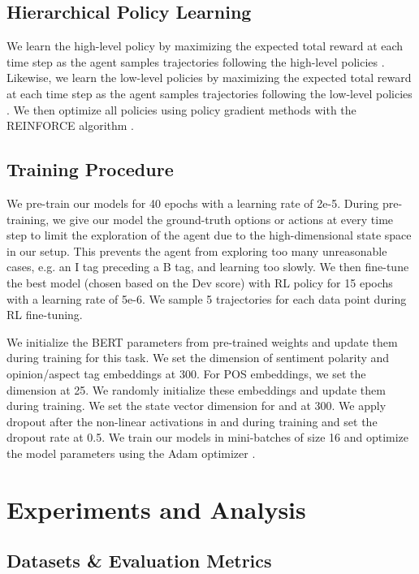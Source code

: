 \documentclass[sigconf]{acmart}
\begin{document}
\begin{table}[ht!]
\subsection{Hierarchical Policy Learning}
We learn the high-level policy by maximizing the expected total reward at each time step  as the agent samples trajectories following the high-level policies . Likewise, we learn the low-level policies by maximizing the expected total reward at each time step  as the agent samples trajectories following the low-level policies . We then optimize all policies using policy gradient methods \citep{sutton1999policy} with the REINFORCE algorithm \citep{williams1992simple, takanobu2019hierarchical}.

\subsection{Training Procedure}

We pre-train our \mymodel{} models for 40 epochs with a learning rate of 2e-5. During pre-training, we give our model the ground-truth options or actions at every time step to limit the exploration of the agent due to the high-dimensional state space in our setup. This prevents the agent from exploring too many unreasonable cases, e.g. an I tag preceding a B tag, and learning too slowly. We then fine-tune the best model (chosen based on the Dev  score) with RL policy for 15 epochs with a learning rate of 5e-6. We sample 5 trajectories for each data point during RL fine-tuning. 

We initialize the BERT parameters from pre-trained weights \citep{devlin2018bert} and update them during training for this task. We set the dimension of sentiment polarity and opinion/aspect tag embeddings at 300. For POS embeddings, we set the dimension at 25. We randomly initialize these embeddings and update them during training. We set the state vector dimension for  and  at 300. We apply dropout \cite{srivastava2014dropout} after the non-linear activations in  and  during training and set the dropout rate at 0.5. We train our models in mini-batches of size 16 and optimize the model parameters using the Adam optimizer \cite{kingma2014adam}.

\section{Experiments and Analysis}

\subsection{Datasets \& Evaluation Metrics}


\end{table}
\end{document}
